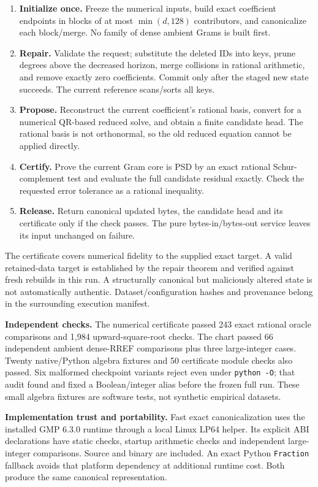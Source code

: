 \documentclass[11pt,a4paper]{article}
\begin{document}
\begin{enumerate}
\item \textbf{Initialize once.} Freeze the numerical inputs, build exact
coefficient endpoints in blocks of at most $\min(d,128)$ contributors, and
canonicalize each block/merge. No family of dense ambient Grams is built first.
\item \textbf{Repair.} Validate the request; substitute the deleted IDs into
keys, prune degrees above the decreased horizon, merge collisions in rational
arithmetic, and remove exactly zero coefficients. Commit only after the staged
new state succeeds. The current reference scans/sorts all keys.
\item \textbf{Propose.} Reconstruct the current coefficient's rational basis,
convert for a numerical QR-based reduced solve, and obtain a finite candidate
head. The rational basis is not orthonormal, so the old reduced equation
cannot be applied directly.
\item \textbf{Certify.} Prove the current Gram core is PSD by an exact rational
Schur-complement test and evaluate the full candidate residual exactly.
Check the requested error tolerance as a rational inequality.
\item \textbf{Release.} Return canonical updated bytes, the candidate head
and its certificate only if the check passes. The pure bytes-in/bytes-out
service leaves its input unchanged on failure.
\end{enumerate}

The certificate covers numerical fidelity to the supplied exact target. A
valid retained-data target is established by the repair theorem and verified
against fresh rebuilds in this run. A structurally canonical but maliciously
altered state is not automatically authentic. Dataset/configuration hashes
and provenance belong in the surrounding execution manifest.

\textbf{Independent checks.} The numerical certificate passed 243 exact
rational oracle comparisons and 1,984 upward-square-root checks. The chart
passed 66 independent ambient dense-RREF comparisons plus three large-integer
cases. Twenty native/Python algebra fixtures and 50 certificate module checks
also passed. Six malformed checkpoint variants reject even under
\texttt{python -O}; that audit found and fixed a Boolean/integer alias before
the frozen full run. These small algebra fixtures are software tests, not
synthetic empirical datasets.

\textbf{Implementation trust and portability.} Fast exact canonicalization
uses the installed GMP 6.3.0 runtime through a local Linux LP64 helper.
Its explicit ABI declarations have static checks, startup arithmetic checks
and independent large-integer comparisons. Source and binary are included.
An exact Python \texttt{Fraction} fallback avoids that platform dependency
at additional runtime cost. Both produce the same canonical representation.
\newpage
\end{document}
